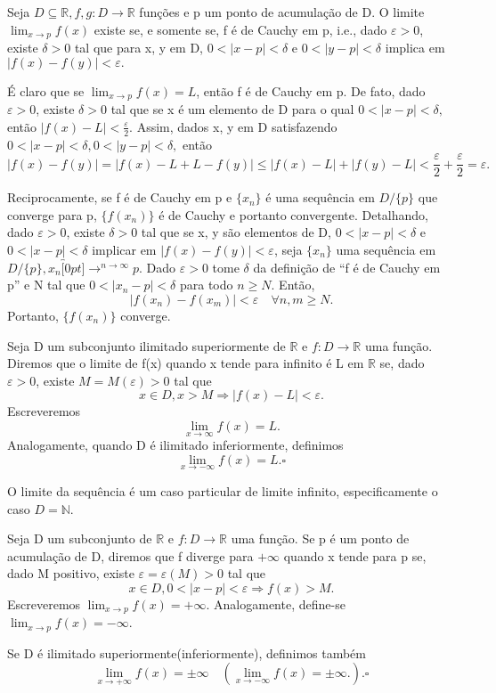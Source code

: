 \documentclass[analysis_notes.tex]{subfiles}
\begin{document}
\begin{theorem*}
	Seja $D\subseteq{\mathbb{R}}, f, g:D\rightarrow \mathbb{R}$ fun\c c\~oes e p um ponto de acumula\c c\~ao de D. O limite
	$\lim_{x\to p}f(x)$ existe se, e somente se, f \'e de Cauchy em p, i.e., dado $\varepsilon > 0$, existe $\delta > 0$ tal que
	para x, y em D, $0<|x-p|<\delta$ e $0<|y-p|<\delta$ implica em $|f(x)-f(y)|<\varepsilon.$
\end{theorem*}
\begin{proof*}
	\'E claro que se $\lim_{x\to p}f(x) = L$, ent\~ao f \'e de Cauchy em p. De fato, dado $\varepsilon > 0$, existe $\delta > 0$
	tal que se x \'e um elemento de D para o qual $0<|x-p|<\delta,$ ent\~ao $|f(x)-L|<\frac{\varepsilon}{2}.$ Assim, dados
	x, y em D satisfazendo $0<|x-p|<\delta, 0<|y-p|<\delta,$ ent\~ao
	$$
		|f(x)-f(y)| = |f(x)-L+L-f(y)|\leq{|f(x)-L| + |f(y)-L|}< \frac{\varepsilon}{2}+\frac{\varepsilon}{2} = \varepsilon.
	$$

	Reciprocamente, se f \'e de Cauchy em p e $\{x_{n}\}$ \'e uma sequ\^encia em $D/\{p\}$ que converge para p,
	$\{f(x_{n})\}$ \'e de Cauchy e portanto convergente. Detalhando, dado $\varepsilon > 0$, existe $\delta > 0$ tal que
	se x, y s\~ao elementos de D, $0 < |x-p| <\delta$ e $0 < |x-p| <\delta$ implicar em $|f(x)-f(y)|<\varepsilon$,
	seja $\{x_{n}\}$ uma sequ\^encia em $D/\{p\}, x_{n}\overbracket[0pt]{\longrightarrow}^{n\to \infty}p$. Dado $\varepsilon > 0$
	tome $\delta$ da defini\c c\~ao de ``f \'e de Cauchy em p'' e N tal que $0<|x_{n}-p|<\delta$ para todo $n\geq{N}.$ Ent\~ao,
	$$
		|f(x_{n})-f(x_{m})| < \varepsilon\quad \forall n, m\geq{N}.
	$$
	Portanto, $\{f(x_{n})\}$ converge. \qedsymbol
\end{proof*}
\begin{def*}
	Seja D um subconjunto ilimitado superiormente de $\mathbb{R}$ e $f:D\rightarrow \mathbb{R}$ uma fun\c c\~ao. Diremos que
	o limite de f(x) quando x tende para infinito \'e L em $\mathbb{R}$ se, dado $\varepsilon > 0$, existe $M = M(\varepsilon) > 0$
	tal que
	$$
		x\in D, x > M \Rightarrow |f(x)-L|<\varepsilon.
	$$
	Escreveremos
	$$
		\lim_{x\to\infty}f(x) = L.
	$$
	Analogamente, quando D \'e ilimitado inferiormente, definimos
	$$
		\lim_{x\to-\infty}f(x) = L.\square
	$$
\end{def*}
O limite da sequ\^encia \'e um caso particular de limite infinito, especificamente o caso $D = \mathbb{N}.$
\begin{def*}
	Seja D um subconjunto de $\mathbb{R}$ e $f:D\rightarrow \mathbb{R}$ uma fun\c c\~ao. Se p \'e um ponto de acumula\c c\~ao de D,
	diremos que f diverge para $+\infty$ quando x tende para p se, dado M positivo, existe $\varepsilon = \varepsilon(M) > 0$
	tal que
	$$
		x\in D, 0<|x-p|<\varepsilon \Rightarrow f(x) > M.
	$$
	Escreveremos $\lim_{x\to p}f(x) = +\infty$. Analogamente, define-se $\lim_{x\to p}f(x) =-\infty$.

	Se D \'e ilimitado superiormente(inferiormente), definimos tamb\'em
	$$
		\lim_{x\to+\infty}f(x) = \pm\infty\quad(\lim_{x\to-\infty}f(x)=\pm\infty.). \square
	$$
\end{def*}
\end{document}
